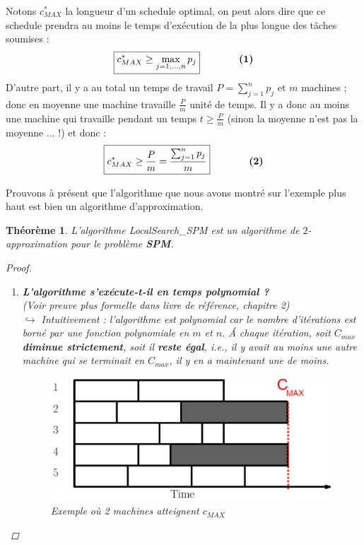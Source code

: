 \documentclass[12pt]{article}
\newcommand{\titre}[1]{\textcolor{title}{#1}}
\newtheorem{thm}{Th\'eor\`eme}[section]
\newtheorem{proof}{Preuve}[section]
\begin{document}
Notons $c^*_{MAX}$ la longueur d'un schedule optimal, on peut alors dire que ce schedule prendra au moins le temps d'exécution de la plus
longue des tâches soumises :
$$\boxed{c^*_{MAX} \geq \max_{j=1,\ldots,n} p_j} \qquad\qquad \text{\textbf{(1)}}$$
D'autre part, il y a au total un temps de travail $P = \sum_{j=1}^n p_j$ et $m$ machines ; donc en
moyenne une machine travaille $\frac{P}{m}$ unité de temps. Il y a donc au moins
une machine qui travaille pendant un temps $t \geq \frac{P}{m}$ (sinon la moyenne n'est pas la moyenne $\ldots$ !) et donc :
$$\boxed{c^*_{MAX} \geq \frac{P}{m} = \frac{\sum_{j=1}^n p_j}{m}} \qquad\qquad \text{\textbf{(2)}}$$

Prouvons à présent que l'algorithme que nous avons montré sur l'exemple plus haut est bien un algorithme d'approximation.

\begin{thm}L'algorithme LocalSearch\_SPM est un algorithme de $2$-approximation pour le problème \textbf{\titre{SPM}}.
\begin{proof}$ $\\
\begin{enumerate}
\item \textbf{L'algorithme s'exécute-t-il en temps polynomial ?}\\ (Voir preuve plus formelle dans livre de référence, chapitre 2) \\
$\hookrightarrow$ Intuitivement : l'algorithme est polynomial car le nombre d'itérations est borné par une fonction polynomiale en $m$ et $n$.
\'A chaque itération, soit $C_{max}$ \textbf{diminue strictement}, soit il
\textbf{reste égal}, i.e., il y avait au moins une autre machine qui se terminait en
$C_{max}$, il y en a maintenant une de moins.
\begin{figure}[h!]
    \begin{center}
    \includegraphics[scale=0.5]{spm3.pdf}
    \caption{Exemple où 2 machines atteignent $c_{MAX}$}
    \end{center}
\end{figure}


\end{enumerate}
\end{proof}
\end{thm}
\end{document}
